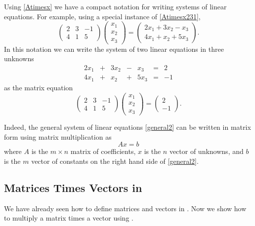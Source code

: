 \documentclass{ximera}
\begin{document}
Using \eqref{Atimesx} we have a compact notation for writing
systems of linear equations.  For example, using a special
instance of \eqref{Atimesx231},
\[
\left(
\begin{array}{rrr}
 2  & 3 & -1 \\
 4  & 1 &  5
\end{array}
\right)
\left(
\begin{array}{r}
x_1 \\ x_2 \\ x_3
\end{array}
\right)
=
\left(
\begin{array}{c}
2x_1 + 3x_2 - x_3 \\
4x_1 + x_2 + 5x_3
\end{array}
\right).
\]
In this notation we can write the system of two linear equations
in three unknowns
\[
\begin{array}{ccccccr}
2x_1 & + & 3x_2 & - &  x_3 & = &   2 \\
4x_1 & + &  x_2 & + & 5x_3 & = &  -1
\end{array}
\]
as the matrix equation
\[
\left(
\begin{array}{rrr}
 2  & 3 & -1 \\
 4  & 1 &  5
\end{array}
\right)
\left(
\begin{array}{r}
x_1 \\ x_2 \\ x_3
\end{array}
\right)
=
\left(
\begin{array}{r}
2 \\ -1
\end{array}
\right).
\]

Indeed, the general system of linear equations \eqref{general2}
can be written in matrix form using matrix multiplication as
\[
Ax=b
\]
where $A$ is the $m\times n$ matrix of coefficients, $x$ is the
$n$ vector of unknowns, and $b$ is the $m$ vector of constants
on the right hand side of \eqref{general2}.


\subsection*{Matrices Times Vectors in \Matlab}

We have already seen how to define matrices and vectors in
\Matlabp.  Now we show how to multiply a matrix times a vector
using \Matlabp{}.
\end{document}
